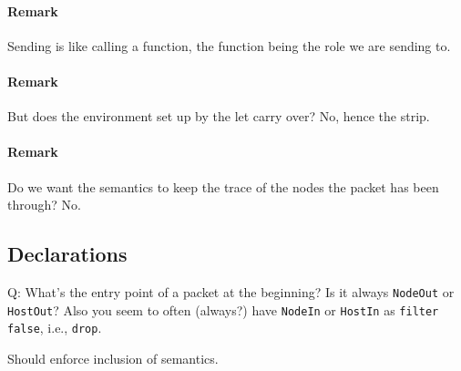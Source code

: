 \documentclass{report}
\begin{document}
\paragraph{Remark} Sending is like calling a function, the function being the role we are sending to.

\paragraph{Remark} But does the environment set up by the let carry over? No, hence the strip.

\paragraph{Remark} Do we want the semantics to keep the trace of the nodes the packet has been through?
No.

\subsection{Declarations}

Q: What's the entry point of a packet at the beginning? Is it always \texttt{NodeOut} or
\texttt{HostOut}? Also you seem to often (always?) have \texttt{NodeIn} or \texttt{HostIn}
as \texttt{filter false}, i.e., \texttt{drop}.

Should enforce inclusion of semantics.
\end{document}
